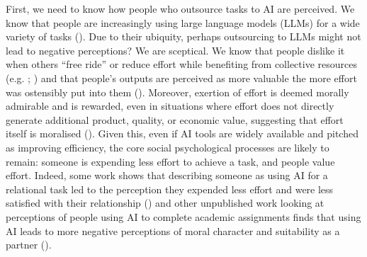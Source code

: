 \documentclass[
  man,
  floatsintext,
  longtable,
  nolmodern,
  notxfonts,
  notimes,
  colorlinks=true,linkcolor=blue,citecolor=blue,urlcolor=blue]{apa7}
\begin{document}
First, we need to know how people who outsource tasks to AI are
perceived. We know that people are increasingly using large language
models (LLMs) for a wide variety of tasks
(). Due to their ubiquity, perhaps outsourcing to LLMs
might not lead to negative perceptions? We are sceptical. We know that
people dislike it when others ``free ride'' or reduce effort while
benefiting from collective resources (e.g.
;
) and that people's outputs are
perceived as more valuable the more effort was ostensibly put into them
(). Moreover, exertion of
effort is deemed morally admirable and is rewarded, even in situations
where effort does not directly generate additional product, quality, or
economic value, suggesting that effort itself is moralised
(). Given this, even
if AI tools are widely available and pitched as improving efficiency,
the core social psychological processes are likely to remain: someone is
expending less effort to achieve a task, and people value effort.
Indeed, some work shows that describing someone as using AI for a
relational task led to the perception they expended less effort and were
less satisfied with their relationship () and other unpublished work looking at perceptions of people
using AI to complete academic assignments finds that using AI leads to
more negative perceptions of moral character and suitability as a
partner ().
\end{document}
